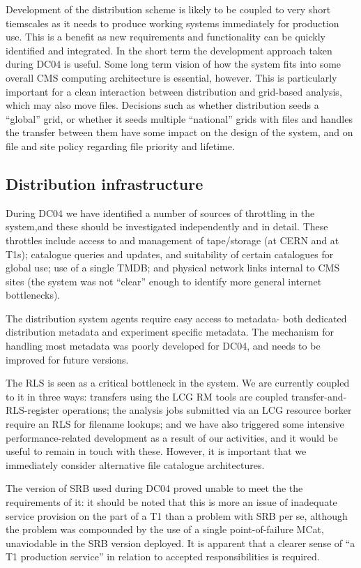 \documentclass{cmspaper}
\begin{document}
Development of the distribution scheme is likely to be coupled to very short tiemscales
as it needs to produce working systems immediately for production use. This is a benefit
as new requirements and functionality can be quickly identified and integrated. In the
short term the development approach taken during DC04 is useful. Some long term vision
of how the system fits into some overall CMS computing architecture is essential,
however. This is particularly important for a clean interaction between distribution and
grid-based analysis, which may also move files. Decisions such as whether distribution
seeds a ``global'' grid, or whether it seeds multiple ``national'' grids with files and 
handles the transfer between them have some impact on the design of the system, and on 
file and site policy regarding file priority and lifetime. 

\subsection{Distribution infrastructure}
During DC04 we have identified a number of sources of throttling in the system,and these
should be investigated independently and in detail. These throttles include access to and
management of tape/storage (at CERN and at T1s); catalogue queries and updates, and 
suitability of certain catalogues for global use; use of a single TMDB; and physical 
network links internal to CMS sites (the system was not ``clear'' enough to identify more
general internet bottlenecks).

The distribution system agents require easy access to metadata- both dedicated 
distribution metadata and experiment specific metadata. The mechanism for handling most
metadata was poorly developed for DC04, and needs to be improved for future versions.

The RLS is seen as a critical bottleneck in the system. We are currently coupled to it in
three ways: transfers using the LCG RM tools are coupled transfer-and-RLS-register
operations; the analysis jobs submitted via an LCG resource borker require an RLS for
filename lookups; and we have also triggered some intensive performance-related
development as a result of our activities, and it would be useful to remain in touch with
these. However, it is important that we immediately consider alternative file catalogue
architectures.

The version of SRB used during DC04 proved unable to meet the the requirements of it: it
should be noted that this is more an issue of inadequate service provision on the part
of a T1 than a problem with SRB per se, although the problem was compounded by the use of
a single point-of-failure MCat, unaviodable in the SRB version deployed. It is apparent
 that a clearer sense of ``a T1 production service'' in relation to accepted 
responsibilities is required.
\end{document}
